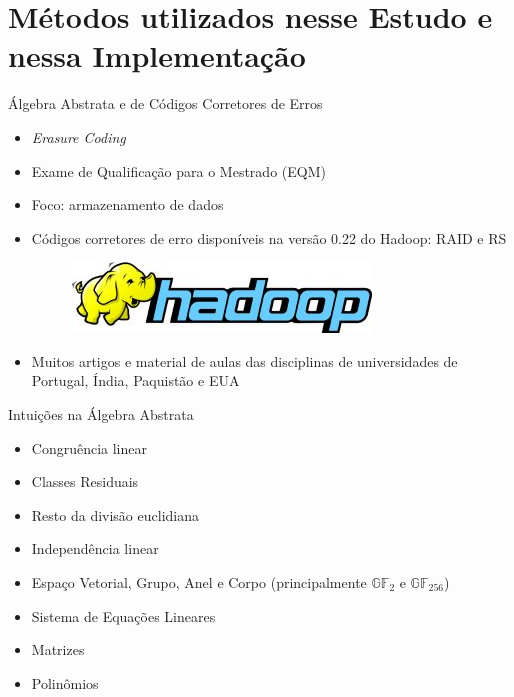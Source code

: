  \section{Métodos utilizados nesse Estudo e nessa Implementação}

  \begin{frame}{Álgebra Abstrata e de Códigos Corretores de Erros}
     \begin{itemize}
        \item<1-> \emph{Erasure Coding}
        \item<2-> Exame de Qualificação para o Mestrado (EQM)
        \item<3-> Foco: armazenamento de dados
        \item<4-> Códigos corretores de erro disponíveis na versão 0.22  do Hadoop: RAID e RS
    \begin{figure}[hb]
      \centering
      \includegraphics[scale=2]{hadoop-logo.jpg}
    \end{figure}

        \item<5-> Muitos artigos e material de aulas das disciplinas de universidades de Portugal, Índia, Paquistão e EUA

     \end{itemize}
  \end{frame}

  \begin{frame}{Intuições na Álgebra Abstrata}
     \begin{itemize}
        \item<1-> Congruência linear
        \item<2-> Classes Residuais
        \item<3-> Resto da divisão euclidiana
        \item<4-> Independência linear
        \item<5-> Espaço Vetorial, Grupo, Anel e Corpo (principalmente $\mathbb{GF}_2$ e $\mathbb{GF}_{256}$)
        \item<6-> Sistema de Equações Lineares
        \item<7-> Matrizes
        \item<8-> Polinômios
     \end{itemize}
  \end{frame}


